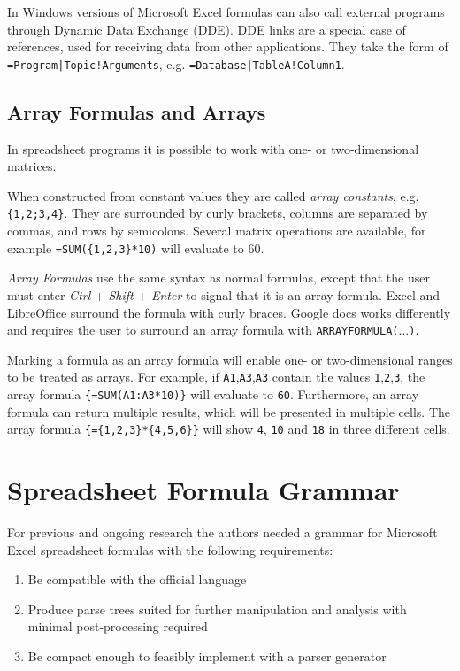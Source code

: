 \documentclass[conference]{IEEEtran}
\begin{document}
In Windows versions of Microsoft Excel formulas can also call external programs through Dynamic Data Exchange (DDE). DDE links are a special case of references, used for receiving data from other applications. They take the form of \texttt{=Program|Topic!Arguments}, e.g. \texttt{=Database|TableA!Column1}.

\subsection{Array Formulas and Arrays}
\label{sec:arrayformulas}
In spreadsheet programs it is possible to work with one- or two-dimensional matrices.

When constructed from constant values they are called \emph{array constants}, e.g. \texttt{\{1,2;3,4\}}.
They are surrounded by curly brackets, columns are separated by commas, and rows by semicolons.
Several matrix operations are available, for example \texttt{=SUM(\{1,2,3\}*10)} will evaluate to 60.

\emph{Array Formulas} use the same syntax as normal formulas, except that the user must enter \emph{Ctrl} + \emph{Shift} + \emph{Enter} to signal that it is an array formula.
Excel and LibreOffice surround the formula with curly braces.
Google docs works differently and requires the user to surround an array formula with \texttt{ARRAYFORMULA($\ldots$)}.

Marking a formula as an array formula will enable one- or two-dimensional ranges to be treated as arrays.
For example, if \texttt{A1},\texttt{A3},\texttt{A3} contain the values \texttt{1},\texttt{2},\texttt{3}, the array formula \texttt{\{=SUM(A1:A3*10)\}} will evaluate to \texttt{60}. Furthermore, an array formula can return multiple results, which will be presented in multiple cells.
The array formula \texttt{\{=\{1,2,3\}*\{4,5,6\}\}} will show \texttt{4}, \texttt{10} and \texttt{18} in three different cells.

\section{Spreadsheet Formula Grammar}
\label{section:grammar}

For previous and ongoing research the authors needed a grammar for Microsoft Excel spreadsheet formulas with the following requirements:

\label{sec:designgoals}
\begin{enumerate}
\item Be compatible with the official language
\item Produce parse trees suited for further manipulation and analysis with minimal post-processing required
\item Be compact enough to feasibly implement with a parser generator
\end{enumerate}
\end{document}
